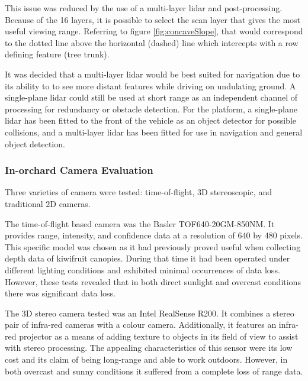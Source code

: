 \documentclass[preprint,authoryear,12pt]{elsarticle}
\begin{document}
        This issue was reduced by the use of a multi-layer lidar and post-processing.
        Because of the 16 layers, it is possible to select the scan layer that gives the most useful viewing range.
        Referring to figure \ref{fig:concaveSlope}, that would correspond to the dotted line above the horizontal (dashed) line which intercepts with a row defining feature (tree trunk).

        It was decided that a multi-layer lidar would be best suited for navigation due to its ability to to see more distant features while driving on undulating ground.
        A single-plane lidar could still be used at short range as an independent channel of processing for redundancy or obstacle detection.
        For the platform, a single-plane lidar has been fitted to the front of the vehicle as an object detector for possible collisions, and a multi-layer lidar has been fitted for use in navigation and general object detection.


    \subsubsection{In-orchard Camera Evaluation}
        \label{sect:camera_evaluation}

        Three varieties of camera were tested: time-of-flight, 3D stereoscopic, and traditional 2D cameras.

        The time-of-flight based camera was the Basler TOF640-20GM-850NM.
        It provides range, intensity, and confidence data at a resolution of 640 by 480 pixels.
        This specific model was chosen as it had previously proved useful when collecting depth data of kiwifruit canopies.
        During that time it had been operated under different lighting conditions and exhibited minimal occurrences of data loss.
        However, these tests revealed that in both direct sunlight and overcast conditions there was significant data loss.

        The 3D stereo camera tested was an Intel RealSense R200.
        It combines a stereo pair of infra-red cameras with a colour camera.
        Additionally, it features an infra-red projector as a means of adding texture to objects in its field of view to assist with stereo processing.
        The appealing characteristics of this sensor were its low cost and its claim of being long-range and able to work outdoors.
        However, in both overcast and sunny conditions it suffered from a complete loss of range data.
\end{document}
